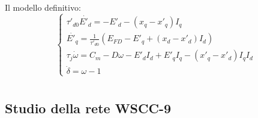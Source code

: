 \documentclass[Lau,noexaminfo]{sapthesis}
\begin{document}
	Il modello definitivo:\\
	\[
	\begin{cases}
	\tau'_{d0} \dot{E'_d}=-E'_d-(x_q-x'_q)I_q\\
	\dot{E'_q}=\frac{1}{\tau'_{d0}}(E_{FD}-E'_q+(x_d-x'_d)I_d)\\
	\tau_j\dot{\omega}=C_m-D\omega-E'_dI_d+E'_qI_q-(x'_q-x'_d)I_qI_d\\
	\dot{\delta}=\omega-1
	\end{cases}
	\]
	\chapter{}
	\section{Studio della rete WSCC-9}
\end{document}
